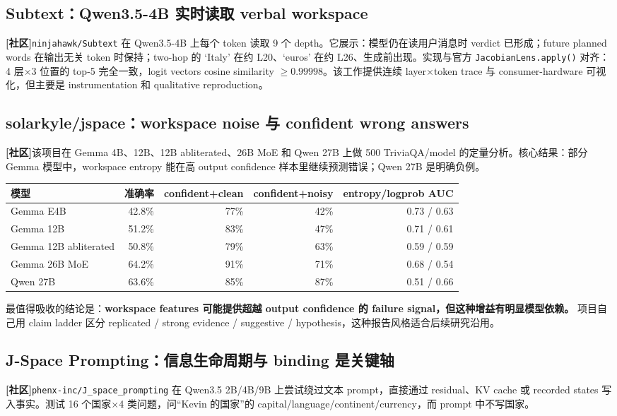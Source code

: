 \documentclass[10.5pt,a4paper]{ctexart}
\newcommand{\Community}{\textbf{[社区]}}
\begin{document}
\subsection{Subtext：Qwen3.5-4B 实时读取 verbal workspace}
\Community \texttt{ninjahawk/Subtext} 在 Qwen3.5-4B 上每个 token 读取 9 个 depth。它展示：模型仍在读用户消息时 verdict 已形成；future planned words 在输出无关 token 时保持；two-hop 的 `Italy' 在约 L20、`euros' 在约 L26、生成前出现。实现与官方 \texttt{JacobianLens.apply()} 对齐：4 层$\times$3 位置的 top-5 完全一致，logit vectors cosine similarity $\ge0.99998$。该工作提供连续 layer$\times$token trace 与 consumer-hardware 可视化，但主要是 instrumentation 和 qualitative reproduction。

\subsection{solarkyle/jspace：workspace noise 与 confident wrong answers}
\Community 该项目在 Gemma 4B、12B、12B abliterated、26B MoE 和 Qwen 27B 上做 500 TriviaQA/model 的定量分析。核心结果：部分 Gemma 模型中，workspace entropy 能在高 output confidence 样本里继续预测错误；Qwen 27B 是明确负例。

\begin{longtable}{p{}rrrr}
\toprule
模型 & 准确率 & confident+clean & confident+noisy & entropy/logprob AUC \\
\midrule
Gemma E4B & 42.8\% & 77\% & 42\% & 0.73 / 0.63 \\
Gemma 12B & 51.2\% & 83\% & 47\% & 0.71 / 0.61 \\
Gemma 12B abliterated & 50.8\% & 79\% & 63\% & 0.59 / 0.59 \\
Gemma 26B MoE & 64.2\% & 91\% & 71\% & 0.68 / 0.54 \\
Qwen 27B & 63.6\% & 85\% & 87\% & 0.51 / 0.66 \\
\bottomrule
\end{longtable}
最值得吸收的结论是：\textbf{workspace features 可能提供超越 output confidence 的 failure signal，但这种增益有明显模型依赖。} 项目自己用 claim ladder 区分 replicated / strong evidence / suggestive / hypothesis，这种报告风格适合后续研究沿用。

\subsection{J-Space Prompting：信息生命周期与 binding 是关键轴}
\Community \texttt{phenx-inc/J\_space\_prompting} 在 Qwen3.5 2B/4B/9B 上尝试绕过文本 prompt，直接通过 residual、KV cache 或 recorded states 写入事实。测试 16 个国家$\times$4 类问题，问“Kevin 的国家”的 capital/language/continent/currency，而 prompt 中不写国家。
\end{document}
